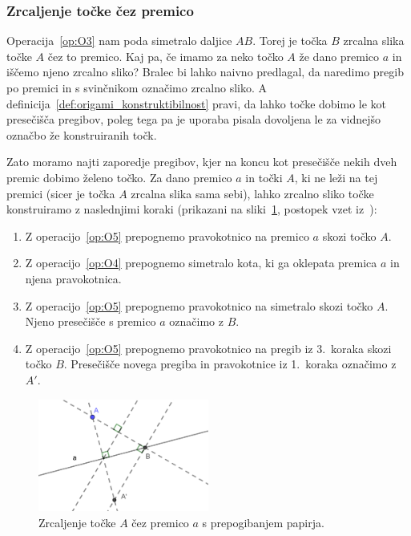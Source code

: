 \subsubsection{Zrcaljenje točke čez premico}
\label{zrcaljenje_origami}

Operacija~\ref{op:O3} nam poda simetralo daljice $AB$. Torej je točka $B$ zrcalna slika točke $A$ čez to premico. Kaj pa, če imamo za neko točko $A$ že dano premico $a$ in iščemo njeno zrcalno sliko? Bralec bi lahko naivno predlagal, da naredimo pregib po premici in s svinčnikom označimo zrcalno sliko. A definicija~\ref{def:origami_konstruktibilnost} pravi, da lahko točke dobimo le kot presečišča pregibov, poleg tega pa je uporaba pisala dovoljena le za vidnejšo označbo že konstruiranih točk.

Zato moramo najti zaporedje pregibov, kjer na koncu kot presečišče nekih dveh premic dobimo želeno točko. Za dano premico $a$ in točki $A$, ki ne leži na tej premici (sicer je točka $A$ zrcalna slika sama sebi), lahko zrcalno sliko točke konstruiramo z naslednjimi koraki (prikazani na sliki~\ref{fig:zrcaljenje_cez_premico}, postopek vzet iz~\cite[str.\ 28]{hull2020}):
\begin{enumerate}
    \item Z operacijo~\ref{op:O5} prepognemo pravokotnico na premico $a$ skozi točko $A$.
    \item Z operacijo~\ref{op:O4} prepognemo simetralo kota, ki ga oklepata premica $a$ in njena pravokotnica.
    \item Z operacijo~\ref{op:O5} prepognemo pravokotnico na simetralo skozi točko $A$. Njeno presečišče s premico $a$ označimo z $B$.
    \item Z operacijo~\ref{op:O5} prepognemo pravokotnico na pregib iz 3.\ koraka skozi točko $B$. Presečišče novega pregiba in pravokotnice iz 1.\ koraka označimo z $A'$.
\end{enumerate}

\begin{figure}[h]
    \centering
    \includegraphics[width=0.5\textwidth]{images/zrcaljenje_tocke_cez_premico.png}
    \caption[Zrcaljenje čez premico]{Zrcaljenje točke $A$ čez premico $a$ s prepogibanjem papirja.}
    \label{fig:zrcaljenje_cez_premico}
\end{figure}

